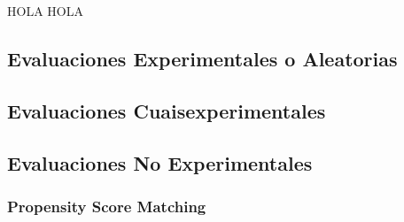 \documentclass[../../main.tex]{subfiles}
\begin{document}
\bigskip
HOLA HOLA 

\subsection{Evaluaciones Experimentales o Aleatorias}
\subsection{Evaluaciones Cuaisexperimentales}
\subsection{Evaluaciones No Experimentales}
\subsubsection{Propensity Score Matching}
\end{document}

